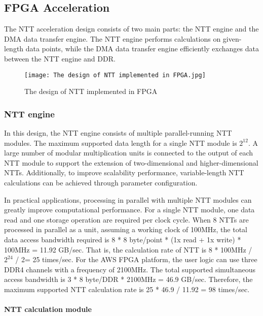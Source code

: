 \subsection{FPGA Acceleration}\label{section: fpga-acceleration}

The NTT acceleration design consists of two main parts: the NTT engine and the DMA data transfer engine. The NTT engine performs calculations on given-length data points, while the DMA data transfer engine efficiently exchanges data between the NTT engine and DDR.

\begin{figure}[ht]
  \centering
  \texttt{[image: The design of NTT implemented in FPGA.jpg]}
  \caption{The design of NTT implemented in FPGA}
  \label{fig:The design of NTT implemented in FPGA}
\end{figure}

\subsubsection{NTT engine}

In this design, the NTT engine consists of multiple parallel-running NTT modules. The maximum supported data length for a single NTT module is $2^{12}$. A large number of modular multiplication units is connected to the output of each NTT module to support the extension of two-dimensional and higher-dimensional NTTs. Additionally, to improve scalability performance, variable-length NTT calculations can be achieved through parameter configuration.

In practical applications, processing in parallel with multiple NTT modules can greatly improve computational performance. For a single NTT module, one data read and one storage operation are required per clock cycle. When 8 NTTs are processed in parallel as a unit, assuming a working clock of 100MHz, the total data access bandwidth required is 8 * 8 byte/point * (1x read + 1x write) * 100MHz = 11.92 GB/sec. That is, the calculation rate of NTT is 8 * 100MHz / $2^{24}$ / 2= 25 times/sec. For the AWS FPGA platform, the user logic can use three DDR4 channels with a frequency of 2100MHz. The total supported simultaneous access bandwidth is 3 * 8 byte/DDR * 2100MHz = 46.9 GB/sec. Therefore, the maximum supported NTT calculation rate is 25 * 46.9 / 11.92 = 98 times/sec.


\paragraph{NTT calculation module}

